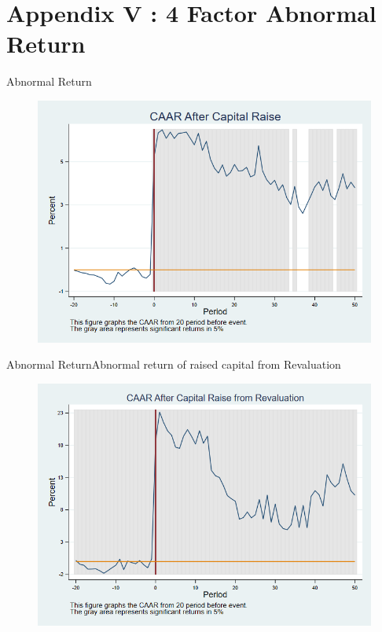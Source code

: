 \documentclass{beamer}
\begin{document}
\section{Appendix V : 4 Factor Abnormal Return}
\begin{frame}{Abnormal Return}
\label{car_4factor}
\begin{figure}
\centering
\includegraphics[width=0.7\linewidth]{Output/car_4factor.png}
\label{fig:car_4factor}
\end{figure}
\end{frame}

\begin{frame}{Abnormal Return}{Abnormal return of raised capital from Revaluation}
\label{car_4factorRevaluation}
\begin{figure}
\centering
\includegraphics[width=0.65\linewidth]{Output/car_4factorRevaluation.png}
\label{fig:car_4factorRevaluation}
\end{figure}

\end{frame}
\end{document}
